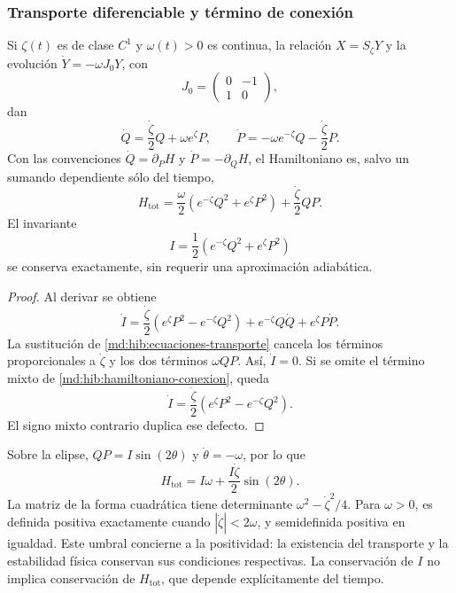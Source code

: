 \subsubsection{Transporte diferenciable y término de conexión}
\label{md:hib:conexion}

Si $\zeta(t)$ es de clase $C^1$ y $\omega(t)>0$ es continua, la relación
$X=S_\zeta Y$ y la evolución $\dot Y=-\omega J_0Y$, con
\begin{equation}
 J_0=\begin{pmatrix}0&-1\\1&0\end{pmatrix},
 \label{md:hib:j-canonico}
\end{equation}
dan
\begin{equation}
 \dot Q=\frac{\dot\zeta}{2}Q+\omega e^\zeta P,\qquad
 \dot P=-\omega e^{-\zeta}Q-\frac{\dot\zeta}{2}P.
 \label{md:hib:ecuaciones-transporte}
\end{equation}
Con las convenciones $\dot Q=\partial_PH$ y
$\dot P=-\partial_QH$, el Hamiltoniano es, salvo un sumando dependiente
sólo del tiempo,
\begin{equation}
 \boxed{H_{\mathrm{tot}}=
 \frac{\omega}{2}\left(e^{-\zeta}Q^2+e^\zeta P^2\right)
 +\frac{\dot\zeta}{2}QP.}
 \label{md:hib:hamiltoniano-conexion}
\end{equation}
El invariante
\begin{equation}
 I=\frac12\left(e^{-\zeta}Q^2+e^\zeta P^2\right)
 \label{md:hib:invariante}
\end{equation}
se conserva exactamente, sin requerir una aproximación adiabática.
\begin{proof}
Al derivar se obtiene
\[
 \dot I=\frac{\dot\zeta}{2}
 \left(e^\zeta P^2-e^{-\zeta}Q^2\right)
 +e^{-\zeta}Q\dot Q+e^\zeta P\dot P.
\]
La sustitución de \eqref{md:hib:ecuaciones-transporte} cancela los términos
proporcionales a $\dot\zeta$ y los dos términos $\omega QP$.
Así, $\dot I=0$. Si se omite el término mixto de
\eqref{md:hib:hamiltoniano-conexion}, queda
\begin{equation}
 \dot I=\frac{\dot\zeta}{2}
 \left(e^\zeta P^2-e^{-\zeta}Q^2\right).
 \label{md:hib:defecto-sin-conexion}
\end{equation}
El signo mixto contrario duplica ese defecto.
\end{proof}
Sobre la elipse, $QP=I\sin(2\theta)$ y $\dot\theta=-\omega$, por lo que
\begin{equation}
 H_{\mathrm{tot}}=I\omega+\frac{I\dot\zeta}{2}\sin(2\theta).
 \label{md:hib:hamiltoniano-elipse}
\end{equation}
La matriz de la forma cuadrática tiene determinante
$\omega^2-\dot\zeta^2/4$. Para $\omega>0$, es definida positiva
exactamente cuando $|\dot\zeta|<2\omega$, y semidefinida positiva en
igualdad. Este umbral concierne a la positividad: la existencia del
transporte y la estabilidad física conservan sus condiciones respectivas.
La conservación de $I$ no implica conservación de $H_{\mathrm{tot}}$,
que depende explícitamente del tiempo.

